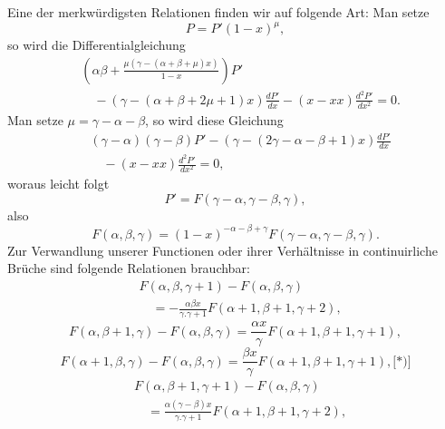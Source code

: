 \begingroup
\makeatletter\tagsleft@true\let\veqno\@@leqno\makeatother
{}
Eine der merkwürdigsten Relationen finden wir auf folgende Art: Man setze
\[P=P'(1-x)^\mu,\]
\noindent so wird die Differentialgleichung
\[
\begin{aligned}
&\left(\alpha\beta+\frac{\mu(\gamma-(\alpha+\beta+\mu)x)}{1-x}\right)P'\\
&\quad -(\gamma-(\alpha+\beta+2\mu+1)x)\frac{dP'}{dx}-(x-xx)\frac{d^2P'}{dx^2}=0.
\end{aligned}
\]
\noindent Man setze $\mu=\gamma-\alpha-\beta$, so wird diese Gleichung
\[
\begin{aligned}
&(\gamma-\alpha)(\gamma-\beta)P'-(\gamma-(2\gamma-\alpha-\beta+1)x)\frac{dP'}{dx}\\
&\quad -(x-xx)\frac{d^2P'}{dx^2}=0,
\end{aligned}
\]
\noindent woraus leicht folgt
\[P'=F(\gamma-\alpha,\gamma-\beta,\gamma),\]
\noindent also
\begin{equation}
F(\alpha,\beta,\gamma)=(1-x)^{-\alpha-\beta+\gamma}F(\gamma-\alpha,\gamma-\beta,\gamma).
\tag*{(32)}
\end{equation}
\clearpage{}
Zur Verwandlung unserer Functionen oder ihrer Verhältnisse in continuirliche Brüche sind folgende Relationen brauchbar:
\begin{equation}
\begin{aligned}
&F(\alpha,\beta,\gamma+1)-F(\alpha,\beta,\gamma)\\
&\quad=-\frac{\alpha\beta x}{\gamma{.}\gamma+1}F(\alpha+1,\beta+1,\gamma+2),
\end{aligned}\tag*{(33)}
\end{equation}
\begin{equation}
F(\alpha,\beta+1,\gamma)-F(\alpha,\beta,\gamma)=\frac{\alpha x}{\gamma}F(\alpha+1,\beta+1,\gamma+1),
\tag*{(34)}
\end{equation}
\begin{equation}
F(\alpha+1,\beta,\gamma)-F(\alpha,\beta,\gamma)=\frac{\beta x}{\gamma}F(\alpha+1,\beta+1,\gamma+1),\text{[*)]}
\tag*{(35)}
\end{equation}
\noindent {\small [S. 41]}
\begin{equation}
\begin{aligned}
&F(\alpha,\beta+1,\gamma+1)-F(\alpha,\beta,\gamma)\\
&\quad=\frac{\alpha(\gamma-\beta)x}{\gamma{.}\gamma+1}F(\alpha+1,\beta+1,\gamma+2),
\end{aligned}\tag*{(36)}
\end{equation}
